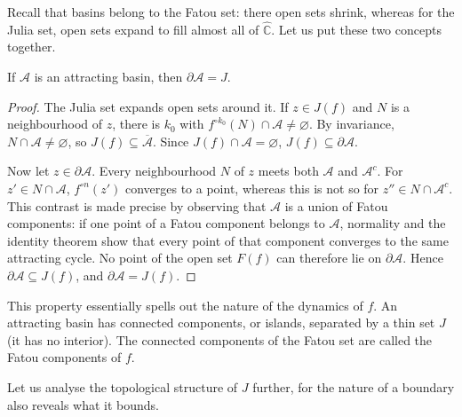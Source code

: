 \documentclass[11pt,a4paper]{article}
\begin{document}
Recall that basins belong to the Fatou set: there open sets shrink, whereas for the Julia set, open sets expand to fill almost all of $\widehat{\mathbb C}$. Let us put these two concepts together.
\setcounter{theorem}{9}\begin{proposition}\label{cd1:boundary}
If $\mathcal A$ is an attracting basin, then $\partial\mathcal A=J$.
\end{proposition}
\begin{proof}
The Julia set expands open sets around it. If $z\in J(f)$ and $N$ is a neighbourhood of $z$, there is $k_0$ with $f^{\circ k_0}(N)\cap\mathcal A\ne\varnothing$. By invariance, $N\cap\mathcal A\ne\varnothing$, so $J(f)\subseteq\overline{\mathcal A}$. Since $J(f)\cap\mathcal A=\varnothing$, $J(f)\subseteq\partial\mathcal A$.

Now let $z\in\partial\mathcal A$. Every neighbourhood $N$ of $z$ meets both $\mathcal A$ and $\mathcal A^c$. For $z'\in N\cap\mathcal A$, $f^{\circ n}(z')$ converges to a point, whereas this is not so for $z''\in N\cap\mathcal A^c$. This contrast is made precise by observing that $\mathcal A$ is a union of Fatou components: if one point of a Fatou component belongs to $\mathcal A$, normality and the identity theorem show that every point of that component converges to the same attracting cycle. No point of the open set $F(f)$ can therefore lie on $\partial\mathcal A$. Hence $\partial\mathcal A\subseteq J(f)$, and $\partial\mathcal A=J(f)$.
\end{proof}
\begin{remark}
This property essentially spells out the nature of the dynamics of $f$. An attracting basin has connected components, or islands, separated by a thin set $J$ (it has no interior). The connected components of the Fatou set are called the Fatou components of $f$.
\end{remark}
Let us analyse the topological structure of $J$ further, for the nature of a boundary also reveals what it bounds.
\end{document}
